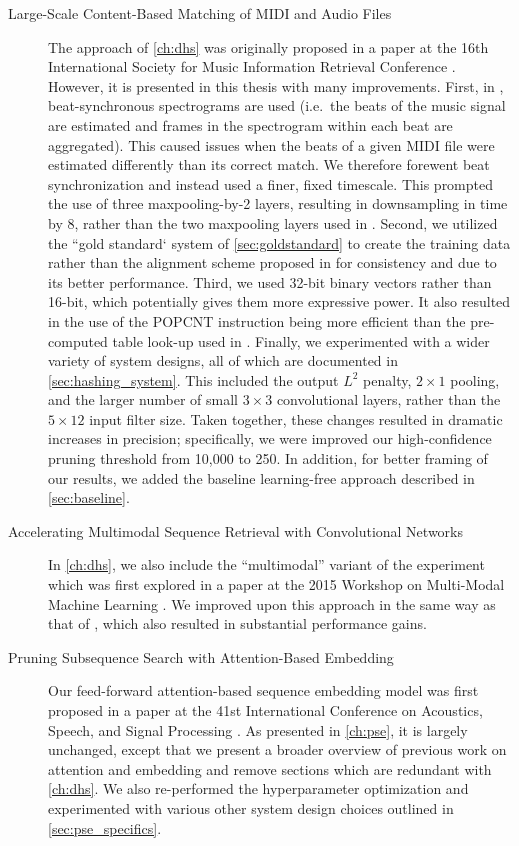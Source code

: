 \begin{description}
\item[Large-Scale Content-Based Matching of MIDI and Audio Files]$\;$\\ The approach of \cref{ch:dhs} was originally proposed in a paper at the 16th International Society for Music Information Retrieval Conference \cite{raffel2015large}.
However, it is presented in this thesis with many improvements.
First, in \cite{raffel2015large}, beat-synchronous spectrograms are used (i.e.\ the beats of the music signal are estimated and frames in the spectrogram within each beat are aggregated).
This caused issues when the beats of a given MIDI file were estimated differently than its correct match.
We therefore forewent beat synchronization and instead used a finer, fixed timescale.
This prompted the use of three maxpooling-by-2 layers, resulting in downsampling in time by 8, rather than the two maxpooling layers used in \cite{raffel2015large}.
Second, we utilized the ``gold standard` system of \cref{sec:goldstandard} to create the training data rather than the alignment scheme proposed in \cite{raffel2015large} for consistency and due to its better performance.
Third, we used 32-bit binary vectors rather than 16-bit, which potentially gives them more expressive power.
It also resulted in the use of the POPCNT instruction being more efficient than the pre-computed table look-up used in \cite{raffel2015large}.
Finally, we experimented with a wider variety of system designs, all of which are documented in \cref{sec:hashing_system}.
This included the output $L^2$ penalty, $2 \times 1$ pooling, and the larger number of small $3 \times 3$ convolutional layers, rather than the $5 \times 12$ input filter size.
Taken together, these changes resulted in dramatic increases in precision; specifically, we were improved our high-confidence pruning threshold from 10,000 to 250.
In addition, for better framing of our results, we added the baseline learning-free approach described in \cref{sec:baseline}.

\item[Accelerating Multimodal Sequence Retrieval with Convolutional Networks]$\;$\\ In \cref{ch:dhs}, we also include the ``multimodal'' variant of the experiment which was first explored in a paper at the 2015 Workshop on Multi-Modal Machine Learning \cite{raffel2015accelerating}.
We improved upon this approach in the same way as that of \cite{raffel2015large}, which also resulted in substantial performance gains.

\item[Pruning Subsequence Search with Attention-Based Embedding]$\;$\\ Our feed-forward attention-based sequence embedding model was first proposed in a paper at the 41st International Conference on Acoustics, Speech, and Signal Processing \cite{raffel2016pruning}.
As presented in \cref{ch:pse}, it is largely unchanged, except that we present a broader overview of previous work on attention and embedding and remove sections which are redundant with \cref{ch:dhs}.
We also re-performed the hyperparameter optimization and experimented with various other system design choices outlined in \cref{sec:pse_specifics}.
\end{description}
